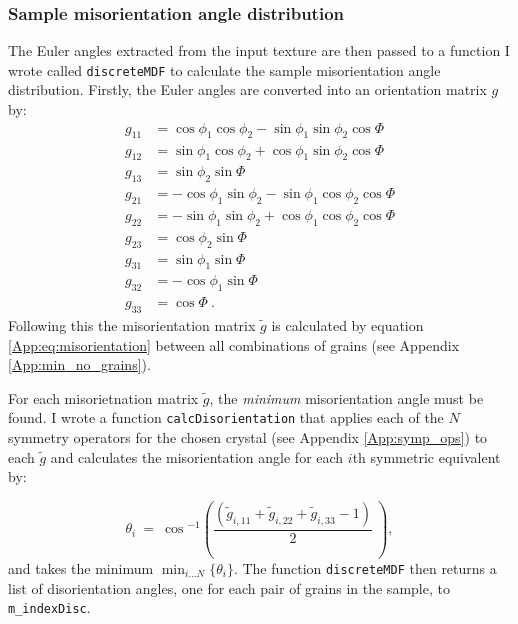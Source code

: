 \documentclass[a4paper,12pt,twoside]{report}
\numberwithin{equation}{chapter}
\begin{document}
\subsubsection{Sample misorientation angle distribution} 
The Euler angles extracted from the input texture are then passed to a function I wrote called \texttt{discreteMDF} to calculate the sample misorientation angle distribution. Firstly, the Euler angles are converted into an orientation matrix $g$ by:    
\begin{equation}
\begin{split}
g_{11} &= \cos{\phi_1}\cos{\phi_2} - \sin{\phi_1}\sin{\phi_2}\cos{\Phi} \\
g_{12} &= \sin{\phi_1}\cos{\phi_2} + \cos{\phi_1}\sin{\phi_2}\cos{\Phi} \\
g_{13} &= \sin{\phi_2}\sin{\Phi} \\
g_{21} &= -\cos{\phi_1}\sin{\phi_2} - \sin{\phi_1}\cos{\phi_2}\cos{\Phi} \\
g_{22} &= -\sin{\phi_1}\sin{\phi_2} + \cos{\phi_1}\cos{\phi_2}\cos{\Phi} \\
g_{23} &= \cos{\phi_2}\sin{\Phi} \\
g_{31} &= \sin{\phi_1}\sin{\Phi} \\
g_{32} &= -\cos{\phi_1}\sin{\Phi} \\
g_{33} &= \cos{\Phi}\ .
\end{split}
\end{equation}
\noindent
Following this the misorientation matrix $\tilde{g}$ is calculated by equation \ref{App:eq:misorientation} between all combinations of grains (see Appendix \ref{App:min_no_grains}).

For each misorietnation matrix $\tilde{g}$, the \emph{minimum} misorientation \citep[disorientation,][]{Grimmer1979} angle must be found. I wrote a function \texttt{calcDisorientation} that applies each of the $N$ symmetry operators for the chosen crystal (see Appendix \ref{App:symp_ops}) to each $\tilde{g}$ and calculates the misorientation angle for each $i$th symmetric equivalent by:   

\begin{equation}
\theta_i\ =\ \cos{}^{-1} \left( \frac{(\tilde{g}_{i,11} + \tilde{g}_{i,22} + \tilde{g}_{i,33} - 1)}{2}\ \right) ,
\end{equation}
\noindent
and takes the minimum $\displaystyle \min_{i...N}\{\theta_i\}$. The function \texttt{discreteMDF} then returns a list of disorientation angles, one for each pair of grains in the sample, to \texttt{m\_indexDisc}. 
\end{document}
